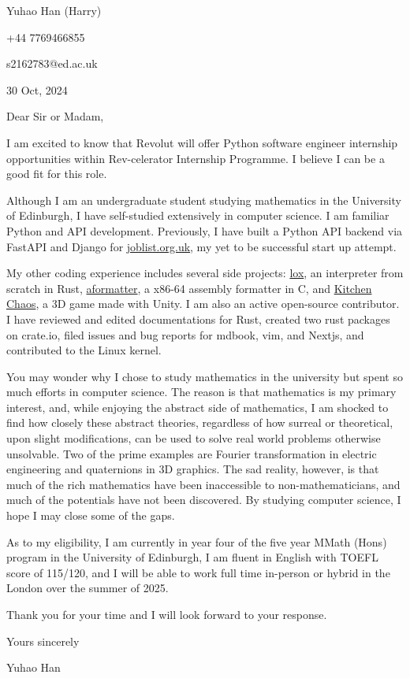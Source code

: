 \documentclass[10pt, a4paper]{article}
\begin{document}
Yuhao Han (Harry)
\vspace{0.5cm}

+44 7769466855

s2162783@ed.ac.uk
\vspace{0.5cm}

30 Oct, 2024

\vspace{0.5cm}
Dear Sir or Madam,

I am excited to know that Revolut will offer Python software engineer internship opportunities within Rev-celerator Internship Programme. 
I believe I can be a good fit for this role.

Although I am an undergraduate student studying mathematics in the University of Edinburgh, I have self-studied extensively in computer science. 
I am familiar Python and API development. 
Previously, I have built a Python API backend via FastAPI and Django for \href{https://joblist.org.uk}{joblist.org.uk}, my yet to be successful start up attempt.

My other coding experience includes several side projects: 
\href{https://github.com/harryhanYuhao/lox-rust}{lox}, an interpreter from scratch in Rust,
\href{https://github.com/harryhanYuhao/aformatter}{aformatter}, a x86-64 assembly formatter in C,
and \href{https://github.com/harryhanYuhao/KitchenChaos}{Kitchen Chaos}, a 3D game made with Unity.
I am also an active open-source contributor.
I have reviewed and edited documentations for Rust, created two rust packages on crate.io, filed issues and bug reports for mdbook, vim, and Nextjs, and contributed to the Linux kernel.

You may wonder why I chose to study mathematics in the university but spent so much efforts in computer science.
The reason is that mathematics is my primary interest,
and, while enjoying the abstract side of mathematics, I am shocked to find how closely these abstract theories, regardless of how surreal or theoretical, upon slight modifications, can be used to solve real world problems otherwise unsolvable. 
Two of the prime examples are Fourier transformation in electric engineering and quaternions in 3D graphics.
The sad reality, however, is that much of the rich mathematics have been inaccessible to non-mathematicians, and much of the potentials have not been discovered. 
By studying computer science, I hope I may close some of the gaps.

As to my eligibility, I am currently in year four of the five year MMath (Hons) program in the University of Edinburgh, 
I am fluent in English with TOEFL score of 115/120,
and I will be able to work full time in-person or hybrid in the London over the summer of 2025.

Thank you for your time and I will look forward to your response.

\vspace{0.5cm}
Yours sincerely
\vspace{0.5cm}

Yuhao Han
\end{document}
